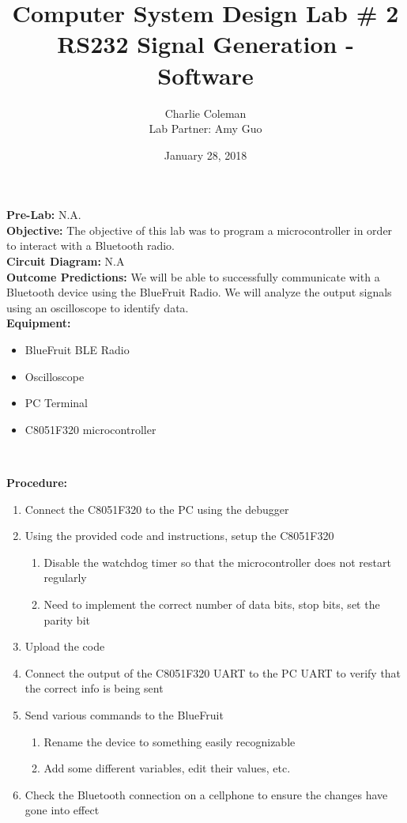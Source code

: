 \documentclass{article}
\title{Computer System Design Lab \# 2\\RS232 Signal Generation - Software}
\author{Charlie Coleman \\ Lab Partner: Amy Guo}
\date{January 28, 2018}
\begin{document}
\maketitle
\pagebreak

\noindent\textbf{Pre-Lab:} N.A.\\

\noindent\textbf{Objective:} The objective of this lab was to program a microcontroller in order to interact with a Bluetooth radio.\\

\noindent\textbf{Circuit Diagram:} N.A\\

\noindent\textbf{Outcome Predictions:} We will be able to successfully communicate with a Bluetooth device using the BlueFruit Radio. We will analyze the output signals using an oscilloscope to identify data.\\ 

\noindent\textbf{Equipment:}

\begin{itemize}[noitemsep, nolistsep]
	\item BlueFruit BLE Radio
	\item Oscilloscope
	\item PC Terminal
	\item C8051F320 microcontroller
\end{itemize}~

\noindent\textbf{Procedure:}

\begin{enumerate}
	\item Connect the C8051F320 to the PC using the debugger
	\item Using the provided code and instructions, setup the C8051F320 
	\begin{enumerate}
		\item Disable the watchdog timer so that the microcontroller does not restart regularly
		\item Need to implement the correct number of data bits, stop bits, set the parity bit
	\end{enumerate}
	\item Upload the code
	\item Connect the output of the C8051F320 UART to the PC UART to verify that the correct info is being sent
	\item Send various commands to the BlueFruit
	\begin{enumerate}
		\item Rename the device to something easily recognizable
		\item Add some different variables, edit their values, etc.
	\end{enumerate}
	\item Check the Bluetooth connection on a cellphone to ensure the changes have gone into effect
\end{enumerate}~
\end{document}

